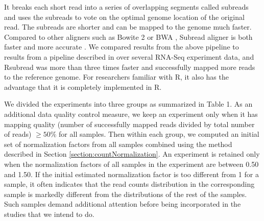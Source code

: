 \documentclass[letterpaper,12pt]{article}
\begin{document}
It breaks each short read into a series of overlapping segments called
subreads and uses the subreads to vote on the optimal genome location of the
original read. The subreads are shorter and can be mapped to the genome much
faster.
Compared to other aligners such as Bowite 2 \citep{langmead2012fast} or BWA
\citep{li2009fast}, Subread aligner is both faster and more accurate
\citep{liao2013subread}. We compared results from the above
pipeline to results from a pipeline described in \cite{anders2013count} over several RNA-Seq experiment data, and Rsubread
was more than three times faster and successfully mapped more reads to the
reference genome.  For researchers familiar with R, it also has the advantage
that it is completely implemented in R.



We divided the experiments into three groups as summarized in Table 1.  As an
additional data quality control measure,  we keep an experiment only when it 
has mapping quality (number of successfully mapped reads divided by total number of reads) $\geq 50\%$ for all samples.
Then within each group, we computed an
initial set of normalization factors from all samples combined using the method
described in Section \ref{section:countNormalization}.  An experiment is
retained only when the normalization factors of all samples in the experiment
are between 0.50 and 1.50.  If the initial estimated normalization factor is
too different from 1 for a sample, it often indicates that the read counts
distribution in the corresponding sample is markedly different from the
distributions of the rest of the samples. Such samples demand additional
attention before being incorporated in the studies that we intend to do.


\end{document}
